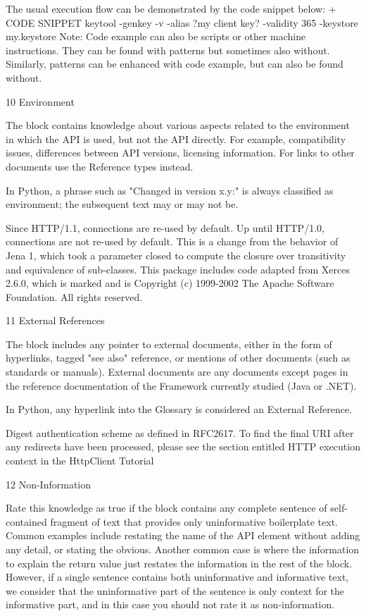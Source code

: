 The usual execution flow can be demonstrated by the code snippet below: + CODE SNIPPET
keytool -genkey -v -alias ?my client key? -validity 365 -keystore my.keystore
Note: Code example can also be scripts or other machine instructions. They can be found with patterns but sometimes also without. Similarly, patterns can be enhanced with code example, but can also be found without.

10 Environment

The block contains knowledge about various aspects related to the environment in which the API is used, but not the API directly. For example, compatibility issues, differences between API versions, licensing information. For links to other documents use the Reference types instead.

In Python, a phrase such as "Changed in version x.y:" is always classified as environment; the subsequent text may or may not be.

Since HTTP/1.1, connections are re-used by default. Up until HTTP/1.0, connections are not re-used by default.
This is a change from the behavior of Jena 1, which took a parameter closed to compute the closure over transitivity and equivalence of sub-classes.
This package includes code adapted from Xerces 2.6.0, which is marked and is Copyright (c) 1999-2002 The Apache Software Foundation. All rights reserved.
 

11 External References

The block includes any pointer to external documents, either in the form of hyperlinks, tagged "see also" reference, or mentions of other documents (such as standards or manuals). External documents are any documents except pages in the reference documentation of the Framework currently studied (Java or .NET).

In Python, any hyperlink into the Glossary is considered an External Reference.

Digest authentication scheme as defined in RFC2617.
To find the final URI after any redirects have been processed, please see the section entitled HTTP execution context in the HttpClient Tutorial
 

12 Non-Information

Rate this knowledge as true if the block contains any complete sentence of self-contained fragment of text that provides only uninformative boilerplate text. Common examples include restating the name of the API element without adding any detail, or stating the obvious. Another common case is where the information to explain the return value just restates the information in the rest of the block. However, if a single sentence contains both uninformative and informative text, we consider that the uninformative part of the sentence is only context for the informative part, and in this case you should not rate it as non-information.

